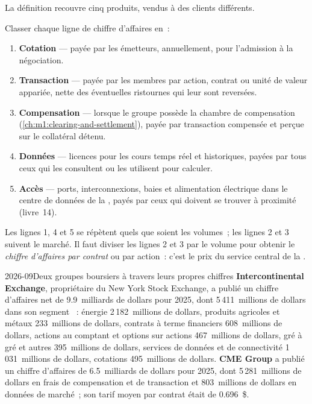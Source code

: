La définition recouvre cinq produits, vendus à des clients différents.

\begin{method}\label{met:m1:exchanges-brokers-venues:products}
Classer chaque ligne de chiffre d'affaires en~:
\begin{enumerate}
\item \textbf{Cotation} --- payée par les émetteurs, annuellement, pour l'admission
  à la négociation.
\item \textbf{Transaction} --- payée par les membres par action, contrat ou unité de valeur
  appariée, nette des éventuelles ristournes qui leur sont reversées.
\item \textbf{Compensation} --- lorsque le groupe possède la chambre de
  compensation (\cref{ch:m1:clearing-and-settlement}), payée par transaction compensée et
  perçue sur le collatéral détenu.
\item \textbf{Données} --- licences pour les cours temps réel et historiques, payées par
  tous ceux qui les consultent ou les utilisent pour calculer.
\item \textbf{Accès} --- ports, interconnexions, baies et alimentation électrique dans le
  centre de données de la , payés par ceux qui doivent se trouver à proximité
  (livre~14).
\end{enumerate}
Les lignes 1, 4 et 5 se répètent quels que soient les volumes~; les lignes 2 et 3 suivent le marché.
Il faut diviser les lignes 2 et 3 par le volume pour obtenir le \emph{chiffre d'affaires par contrat} ou
par action~: c'est le prix du service central de la .
\end{method}

\begin{dated}{2026-09}{Deux groupes boursiers à travers leurs propres chiffres}\label{dat:m1:exchanges-brokers-venues:groups}
\textbf{Intercontinental Exchange}, propriétaire du New York Stock Exchange, a publié
un chiffre d'affaires net de 9.9~milliards de dollars pour 2025, dont 5\,411~millions de
dollars dans son segment ~: énergie 2\,182~millions de dollars, produits agricoles et métaux
233~millions de dollars, contrats à terme financiers 608~millions de dollars, actions au comptant et
options sur actions 467~millions de dollars, gré à gré et autres 395~millions de dollars, services de données et
de connectivité 1\,031~millions de dollars, cotations 495~millions de dollars.
\textbf{CME Group} a publié un chiffre d'affaires de 6.5~milliards de dollars pour 2025, dont
5\,281~millions de dollars en frais de compensation et de transaction et 803~millions de dollars
en données de marché~; son tarif moyen par contrat était de 0.696~\$.
\end{dated}

